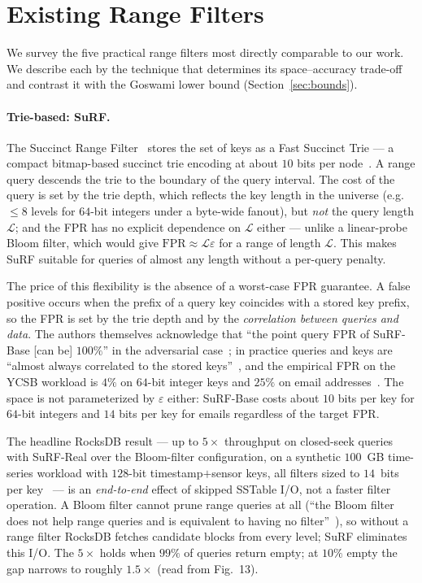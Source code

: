 \section{Existing Range Filters}
\label{sec:existing-work}

We survey the five practical range filters most directly comparable to our work.
We describe each by the technique that determines its
space--accuracy trade-off and contrast it with the Goswami lower
bound (Section~\ref{sec:bounds}).

\paragraph{Trie-based: SuRF.}
The Succinct Range Filter~\citep{zhang2018surf} stores the set of keys
as a Fast Succinct Trie --- a compact bitmap-based succinct trie
encoding at about $10$ bits per node~\citep[\S4.1.2]{zhang2018surf}.
A range query descends the trie to the boundary of the query interval.
The cost of the query is set by the trie depth, which reflects the
key length in the universe (e.g.\ $\leq 8$ levels for $64$-bit
integers under a byte-wide fanout), but \emph{not} the query length
$\mathcal{L}$; and the FPR has no explicit dependence on $\mathcal{L}$
either --- unlike a linear-probe Bloom filter, which would give
$\mathrm{FPR} \approx \mathcal{L}\varepsilon$ for a range of length $\mathcal{L}$.
This makes SuRF suitable for queries of almost any
length without a per-query penalty.

The price of this flexibility is the absence of a worst-case FPR guarantee.
A false positive occurs when the prefix of a query key
coincides with a stored key prefix, so the FPR is set by the trie
depth and by the \emph{correlation between queries and data}. The
authors themselves acknowledge that ``the point query FPR of
SuRF-Base [can be] $100\%$'' in the adversarial
case~\citep[\S3.2]{zhang2018surf}; in practice queries and keys are
``almost always correlated to the stored
keys''~\citep[\S3.1]{zhang2018surf}, and the empirical FPR on the YCSB
workload is $4\%$ on $64$-bit integer keys and $25\%$ on email
addresses~\citep[\S4.2]{zhang2018surf}.
The space is not parameterized by $\varepsilon$ either: SuRF-Base costs about $10$ bits per key for
$64$-bit integers and $14$ bits per key for emails regardless of the
target FPR.

The headline RocksDB result --- up to $5\times$ throughput on
closed-seek queries with SuRF-Real over the Bloom-filter
configuration, on a synthetic $100$~GB time-series workload with
$128$-bit timestamp$+$sensor keys, all filters sized to $14$~bits per
key~\citep[\S6, Fig.~13]{zhang2018surf} --- is an \emph{end-to-end}
effect of skipped SSTable I/O, not a faster filter operation.
A Bloom filter cannot prune range queries at all (``the Bloom filter
does not help range queries and is equivalent to having no
filter''~\citep[\S6]{zhang2018surf}),
so without a range filter RocksDB fetches candidate blocks from every
level; SuRF eliminates this I/O. The $5\times$ holds when $99\%$ of
queries return empty; at $10\%$ empty the gap narrows to roughly
$1.5\times$ (read from Fig.~13).

